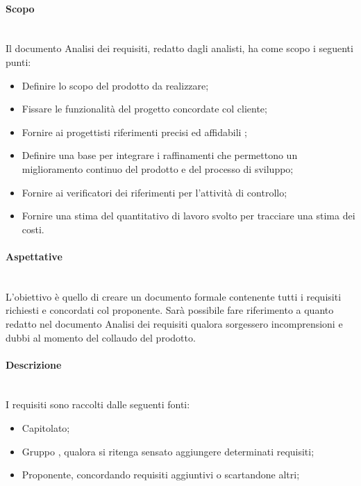 \paragraph{Scopo}\mbox{}\\

Il documento Analisi dei requisiti, redatto dagli analisti, ha come scopo i seguenti punti:

\begin{itemize}
\item Definire lo scopo del prodotto da realizzare;
\item Fissare le funzionalità del progetto concordate col cliente;
\item Fornire ai progettisti riferimenti precisi ed affidabili ;
\item Definire una base per integrare i raffinamenti che permettono un miglioramento continuo del prodotto e del processo di sviluppo;
\item Fornire ai verificatori dei riferimenti per l’attività di controllo;
\item Fornire una stima del quantitativo di lavoro svolto per tracciare una stima dei costi. 
\end{itemize}

\paragraph{Aspettative}\mbox{}\\
L'obiettivo è quello di creare un documento formale contenente tutti i requisiti richiesti e concordati col proponente. Sarà possibile fare riferimento a quanto redatto nel documento Analisi dei requisiti qualora sorgessero incomprensioni e dubbi al momento del collaudo del prodotto.

\paragraph{Descrizione}\mbox{}\\
I requisiti sono raccolti dalle seguenti fonti:
\begin{itemize}
\item Capitolato;
\item Gruppo \Gruppo, qualora si ritenga sensato aggiungere determinati requisiti;
\item Proponente, concordando requisiti aggiuntivi o scartandone altri;
\end{itemize}

